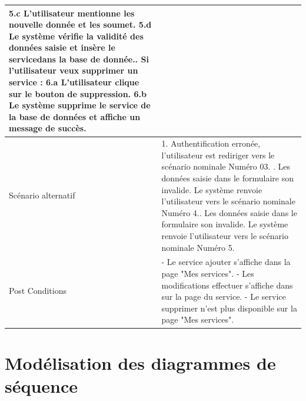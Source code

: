 \documentclass[french]{report}
\begin{document}
\begin{description}
\begin{minipage}{\linewidth}
\begin{tabular}{|m{3cm}|m{9cm}|}
                    5.c L'utilisateur mentionne les nouvelle donnée et les soumet.\newline
                    5.d Le système vérifie la validité des données saisie et insère le service\newline dans la base de donnée.\newline
                6. Si l'utilisateur veux supprimer un service : \newline
                    6.a L'utilisateur clique sur le bouton de suppression.\newline
                    6.b Le système supprime le service de la base de données et affiche un message de succès.\newline
                \\ 
            \hline
            Scénario alternatif &   
                1. Authentification erronée, l'utilisateur est rediriger vers
		le scénario nominale Numéro 03. \newline
                4.  Les données saisie dans le formulaire son invalide.
		Le système renvoie l'utilisateur vers le scénario nominale Numéro 4.\newline
                5.  Les données saisie dans le formulaire son invalide. 
		Le système renvoie l'utilisateur vers le scénario nominale Numéro 5.\newline
                
                
            \\ 
            \hline
            Post Conditions & 
                - Le service ajouter s'affiche dans la page "Mes services".\newline
                - Les modifications effectuer s'affiche dans sur la page du service.\newline
                - Le service supprimer n'est plus disponible sur la page "Mes services".  \newline
            \\
            \hline
            \end{tabular}
        \end{minipage}
    \end{description}

\section{Modélisation des diagrammes de séquence}
\end{document}
